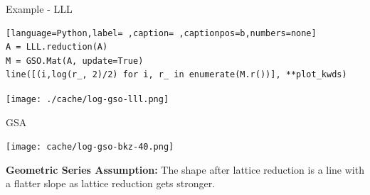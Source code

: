 \documentclass[table,10pt,aspectratio=169]{beamer}
\begin{document}
\begin{frame}[label={sec:org666aa05},fragile]{Example - LLL}
 \begin{lstlisting}[language=Python,label= ,caption= ,captionpos=b,numbers=none]
A = LLL.reduction(A)
M = GSO.Mat(A, update=True)
line([(i,log(r_, 2)/2) for i, r_ in enumerate(M.r())], **plot_kwds)
\end{lstlisting}

\begin{center}
\texttt{[image: ./cache/log-gso-lll.png]}
\end{center}
\end{frame}

\begin{frame}[label={sec:org7149aef}]{GSA}
\begin{center}
\texttt{[image: cache/log-gso-bkz-40.png]}
\end{center}

\textbf{Geometric Series Assumption:} The shape after lattice reduction is a line with a flatter slope as lattice reduction gets stronger.
\end{frame}
\end{document}
